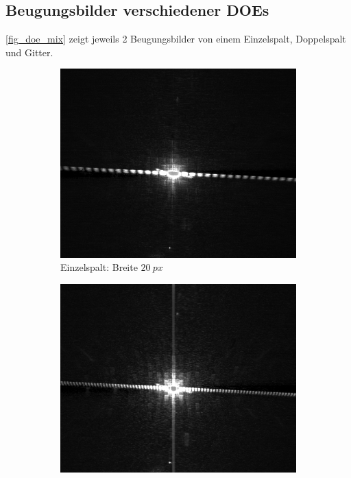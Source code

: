 \documentclass[
	a4paper,
	12pt,
	pagesize,
	ngerman
]{scrartcl}
\begin{document}
		\subsection{Beugungsbilder verschiedener DOEs}
 		\cref{fig_doe_mix} zeigt jeweils 2 Beugungsbilder von einem Einzelspalt, Doppelspalt und Gitter.
		\begin{figure}[H]
        \centering
        \begin{subfigure}[b]{0.475\textwidth}
            \centering
            \includegraphics[width=\textwidth]{raw/singleslid_20_width}
            \caption%
            {Einzelspalt: Breite $\SI{20}{px}$}
            \label{fig_singleslid_20}
        \end{subfigure}
        \hfill
        \begin{subfigure}[b]{0.475\textwidth}
            \centering
            \includegraphics[width=\textwidth]{raw/singleslid_50_width}

\end{subfigure}
\end{figure}
\end{document}
